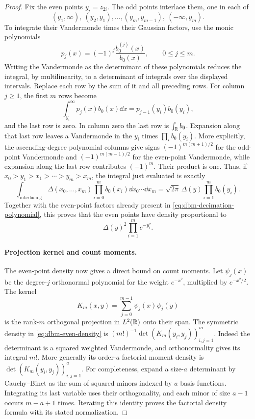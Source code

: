 \begin{proof}
Fix the even points \(y_i=z_{2i}\).
The odd points interlace them, one in each of
\[
 (y_1,\infty),\ (y_2,y_1),\ldots,(y_m,y_{m-1}),\
 (-\infty,y_m).
\]
To integrate their Vandermonde times their Gaussian factors, use
the monic polynomials
\[
 p_j(x)=(-1)^j\frac{b_0^{(j)}(x)}{b_0(x)},
 \qquad 0\le j\le m.
\]
Writing the Vandermonde as the determinant of these polynomials
reduces the integral, by multilinearity, to a determinant of
integrals over the displayed intervals. Replace each row by the
sum of it and all preceding rows. For column \(j\ge1\), the first
\(m\) rows become
\[
 \int_{y_i}^\infty p_j(x)b_0(x)\dd x
       =p_{j-1}(y_i)b_0(y_i),
\]
and the last row is zero. In column zero the last row is
\(\int_\mathbb R b_0\).
Expansion along that last row leaves a Vandermonde in the \(y_i\)
times \(\prod_i b_0(y_i)\).
More explicitly, the ascending-degree polynomial columns give signs
\((-1)^{m(m+1)/2}\) for the odd-point Vandermonde and
\((-1)^{m(m-1)/2}\) for the even-point Vandermonde, while expansion
along the last row contributes \((-1)^m\). Their product is one.
Thus, if \(x_0>y_1>x_1>\cdots>y_m>x_m\), the integral just evaluated
is exactly
\[
 \int_{\text{interlacing}}
        \Delta(x_0,\ldots,x_m)\prod_{i=0}^m b_0(x_i)
                \dd x_0\cdots\dd x_m
     =\sqrt{2\pi}\,\Delta(y)\prod_{i=1}^m b_0(y_i).
\]
Together with the even-point factors already present in
\eqref{eq:dbm-decimation-polynomial}, this proves that the even
points have density proportional to
\begin{equation}
 \label{eq:dbm-even-density}
 \Delta(y)^2\prod_{i=1}^m e^{-y_i^2}.
\end{equation}

\paragraph{Projection kernel and count moments.}
The even-point density now gives a direct bound on count moments.
Let \(\psi_j(x)\) be the degree-\(j\) orthonormal polynomial for
the weight \(e^{-x^2}\), multiplied by \(e^{-x^2/2}\).
The kernel
\[
 K_m(x,y)=\sum_{j=0}^{m-1}\psi_j(x)\psi_j(y)
\]
is the rank-\(m\) orthogonal projection in \(L^2(\mathbb R)\) onto their
span. The symmetric density in \eqref{eq:dbm-even-density} is
\((m!)^{-1}\det(K_m(y_i,y_j))_{i,j=1}^m\).
Indeed the determinant is a squared weighted Vandermonde, and
orthonormality gives its integral \(m!\).
More generally its order-\(a\) factorial moment density is
\(\det(K_m(y_i,y_j))_{i,j=1}^a\).
For completeness, expand a size-\(a\) determinant by Cauchy--Binet
as the sum of squared minors indexed by \(a\) basis functions.
Integrating its last variable uses their orthogonality, and each
minor of size \(a-1\) occurs \(m-a+1\) times. Iterating this identity
proves the factorial density formula with its stated normalization.


\end{proof}
